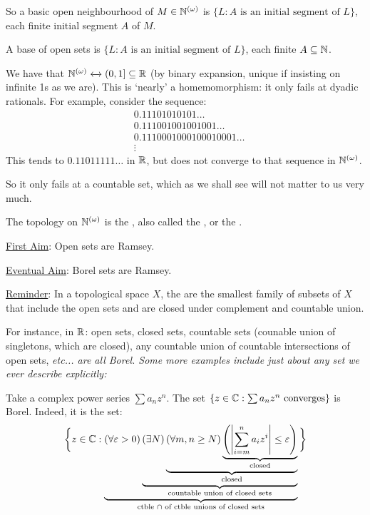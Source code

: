 \documentclass[10pt]{article}
\newcommand{\bom}{{(\omega)}}
\begin{document}
So a basic open neighbourhood of $M \in \N^\bom$ is $\{L : A\textrm{ is an initial segment of }L\}$, each finite initial segment $A$ of $M$.

A base of open sets is $\{L : A \textrm{ is an initial segment of }L\}$, each finite $A\subseteq \mathbb{N}$.

\begin{remark*}
    We have that $\N^\bom \xleftrightarrow{} (0,1]\subset \R$ (by binary expansion, unique if insisting on infinite 1s as we are). This is `nearly' a homemomorphism: it only fails at dyadic rationals. For example, consider the sequence:
    \begin{align*}
        &0.11101010101\dots\\
        &0.111001001001001\dots\\
        &0.1110001000100010001\dots\\
        &\vdots
    \end{align*}
    This tends to $0.11011111\dots$ in $\mathbb{R}$, but does not converge to that sequence in $\N^\bom$.

    So it only fails at a countable set, which as we shall see will not matter to us very much.

    The topology on $\N^\bom$ is the , also called the , or the .
\end{remark*}

\underline{First Aim}: Open sets are Ramsey.

\underline{Eventual Aim}: Borel sets are Ramsey.

\underline{Reminder}: In a topological space $X$, the  are the smallest family of subsets of $X$ that include the open sets and are closed under complement and countable union.

For instance, in $\mathbb{R}$: open sets, closed sets, countable sets (counable union of singletons, which are closed), any countable union of countable intersections of open sets, \it{etc}... are all Borel. Some more examples include just about any set we ever describe explicitly:

Take a complex power series $\sum a_n z^n$. The set $\{z \in \mathbb{C} : \sum a_n z^n\textrm{ converges}\}$ is Borel. Indeed, it is the set: 
\begin{align*}
    \bigg\lbrace z \in \mathbb{C} : \underbrace{(\forall \varepsilon > 0)\underbrace{(\exists N )\underbrace{(\forall m,n\ge N) \underbrace{\left( \left|\sum_{i=m}^na_iz^i\right|\le \varepsilon\right)}_{\textrm{closed}}}_{\textrm{closed}}}_{\textrm{countable union of closed sets}}}_{\textrm{ctble }\cap\textrm{ of ctble unions of closed sets}}  \bigg\rbrace
\end{align*}
\end{document}
